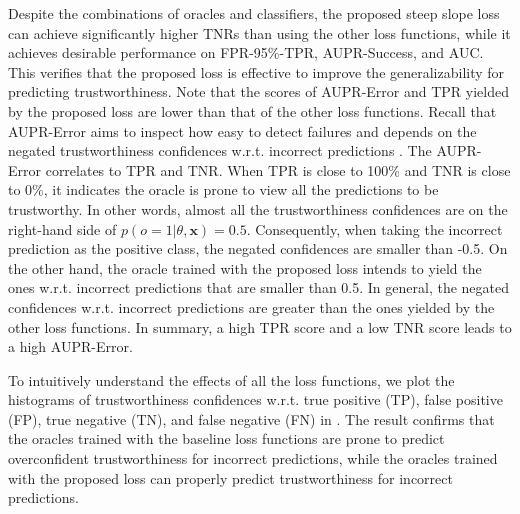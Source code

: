 Despite the combinations of oracles and classifiers, the proposed steep slope loss can achieve significantly higher TNRs than using the other loss functions, while it achieves desirable performance on FPR-95\%-TPR, AUPR-Success, and AUC. This verifies that the proposed loss is effective to improve the generalizability for predicting trustworthiness. Note that the scores of AUPR-Error and TPR yielded by the proposed loss are lower than that of the other loss functions. Recall that AUPR-Error aims to inspect how easy to detect failures and depends on the negated trustworthiness confidences w.r.t. incorrect predictions \cite{Corbiere_NIPS_2019}. The AUPR-Error correlates to TPR and TNR. When TPR is close to 100\% and TNR is close to 0\%, it indicates the oracle is prone to view all the predictions to be trustworthy. In other words, almost all the trustworthiness confidences are on the right-hand side of $p(o=1|\theta,\bm{x})=0.5$. Consequently, when taking the incorrect prediction as the positive class, the negated confidences are smaller than -0.5. On the other hand, the oracle trained with the proposed loss intends to yield the ones w.r.t. incorrect predictions that are smaller than 0.5. In general, the negated confidences w.r.t. incorrect predictions are greater than the ones yielded by the other loss functions. In summary, a high TPR score and a low TNR score leads to a high AUPR-Error.

To intuitively understand the effects of all the loss functions, we plot the histograms of trustworthiness confidences w.r.t. true positive (TP), false positive (FP), true negative (TN), and false negative (FN) in . The result confirms that the oracles trained with the baseline loss functions are prone to predict overconfident trustworthiness for incorrect predictions, while the oracles trained with the proposed loss can properly predict trustworthiness for incorrect predictions.







